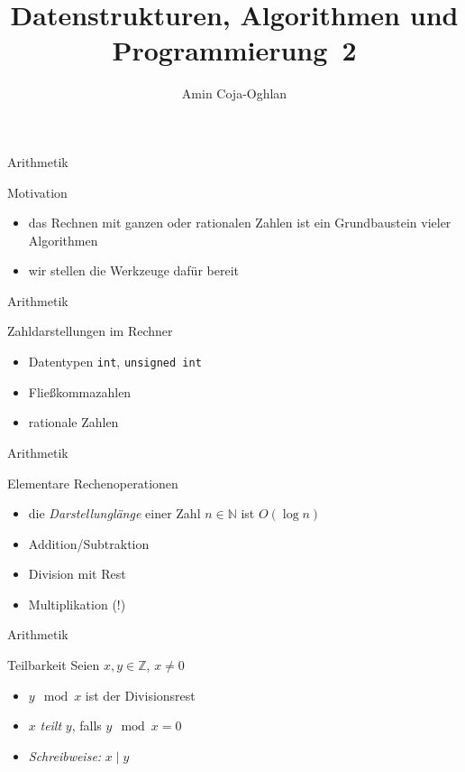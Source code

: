 \documentclass[aspectratio=1610, 11pt]{beamer}
\title{Datenstrukturen, Algorithmen und Programmierung~2}
\author[A.~Coja-Oghlan]{Amin Coja-Oghlan}
\institute[DAP2]{Lehrstuhl Informatik 2\\Fakult\"at f\"ur Informatik}
\newcommand\NN{\mathbb N}
\newcommand\ZZ{\mathbb Z}
\begin{document}
\maketitle

\begin{frame}{Arithmetik}
	\begin{exampleblock}{Motivation}
		\begin{itemize}
			\item das Rechnen mit ganzen oder rationalen Zahlen ist ein Grundbaustein vieler Algorithmen
			\item wir stellen die Werkzeuge daf\"ur bereit
		\end{itemize}
	\end{exampleblock}
\end{frame}

\begin{frame}{Arithmetik}
	\begin{exampleblock}{Zahldarstellungen im Rechner}
		\begin{itemize}
			\item Datentypen {\tt int}, {\tt unsigned int}
			\item Flie\ss kommazahlen
			\item rationale Zahlen
		\end{itemize}
	\end{exampleblock}
\end{frame}

\begin{frame}{Arithmetik}
	\begin{exampleblock}{Elementare Rechenoperationen}
		\begin{itemize}
			\item die {\em Darstellungl\"ange} einer Zahl $n\in\NN$ ist $O(\log n)$
			\item Addition/Subtraktion
			\item Division mit Rest
			\item Multiplikation (!)
		\end{itemize}
	\end{exampleblock}
\end{frame}

\begin{frame}{Arithmetik}
	\begin{exampleblock}{Teilbarkeit}
		Seien $x,y\in\ZZ$, $x\neq0$
		\begin{itemize}
			\item $y\mod x$ ist der Divisionsrest
			\item $x$ \emph{teilt} $y$, falls $y\mod x=0$
			\item \emph{Schreibweise:} $x\mid y$
		\end{itemize}
	\end{exampleblock}
\end{frame}
\end{document}
